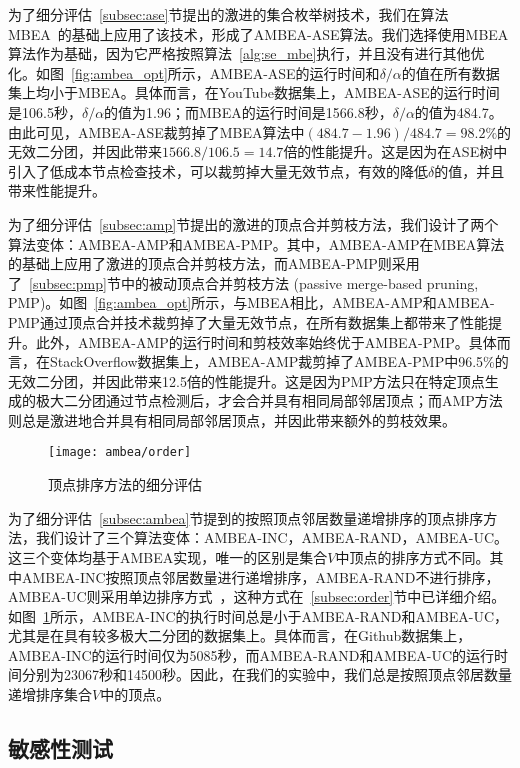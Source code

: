 为了细分评估~\ref{subsec:ase}节提出的激进的集合枚举树技术，我们在算法MBEA~\cite{iMBEA14}的基础上应用了该技术，形成了AMBEA-ASE算法。我们选择使用MBEA算法作为基础，因为它严格按照算法~\ref{alg:se_mbe}执行，并且没有进行其他优化。如图~\ref{fig:ambea_opt}所示，AMBEA-ASE的运行时间和$\delta/\alpha$的值在所有数据集上均小于MBEA。具体而言，在YouTube数据集上，AMBEA-ASE的运行时间是106.5秒，$\delta/\alpha$的值为1.96；而MBEA的运行时间是1566.8秒，$\delta/\alpha$的值为484.7。由此可见，AMBEA-ASE裁剪掉了MBEA算法中$(484.7-1.96)/484.7=98.2\%$的无效二分团，并因此带来$1566.8/106.5=14.7$倍的性能提升。这是因为在ASE树中引入了低成本节点检查技术，可以裁剪掉大量无效节点，有效的降低$\delta$的值，并且带来性能提升。

为了细分评估~\ref{subsec:amp}节提出的激进的顶点合并剪枝方法，我们设计了两个算法变体：AMBEA-AMP和AMBEA-PMP。其中，AMBEA-AMP在MBEA算法的基础上应用了激进的顶点合并剪枝方法，而AMBEA-PMP则采用了~\ref{subsec:pmp}节中的被动顶点合并剪枝方法 (passive merge-based pruning, PMP)。如图~\ref{fig:ambea_opt}所示，与MBEA相比，AMBEA-AMP和AMBEA-PMP通过顶点合并技术裁剪掉了大量无效节点，在所有数据集上都带来了性能提升。此外，AMBEA-AMP的运行时间和剪枝效率始终优于AMBEA-PMP。具体而言，在StackOverflow数据集上，AMBEA-AMP裁剪掉了AMBEA-PMP中96.5\%的无效二分团，并因此带来12.5倍的性能提升。这是因为PMP方法只在特定顶点生成的极大二分团通过节点检测后，才会合并具有相同局部邻居顶点；而AMP方法则总是激进地合并具有相同局部邻居顶点，并因此带来额外的剪枝效果。

\begin{figure} [H]
	\centering

		\texttt{[image: ambea/order]}

	\caption{顶点排序方法的细分评估}
	\label{fig:ambea_opt_order}
\end{figure}

为了细分评估~\ref{subsec:ambea}节提到的按照顶点邻居数量递增排序的顶点排序方法，我们设计了三个算法变体：AMBEA-INC，AMBEA-RAND，AMBEA-UC。这三个变体均基于AMBEA实现，唯一的区别是集合$V$中顶点的排序方式不同。其中AMBEA-INC按照顶点邻居数量进行递增排序，AMBEA-RAND不进行排序，AMBEA-UC则采用单边排序方式~\cite{ooMBE22}，这种方式在~\ref{subsec:order}节中已详细介绍。如图~\ref{fig:ambea_opt_order}所示，AMBEA-INC的执行时间总是小于AMBEA-RAND和AMBEA-UC，尤其是在具有较多极大二分团的数据集上。具体而言，在Github数据集上，AMBEA-INC的运行时间仅为5085秒，而AMBEA-RAND和AMBEA-UC的运行时间分别为23067秒和14500秒。因此，在我们的实验中，我们总是按照顶点邻居数量递增排序集合$V$中的顶点。

\subsection{敏感性测试}

